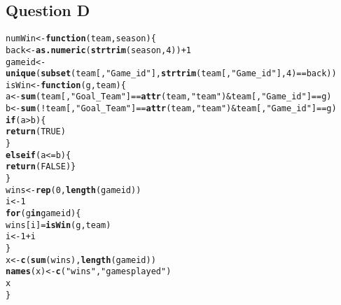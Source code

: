 \documentclass[12pt,letterpaper]{article}\usepackage[]{graphicx}\usepackage[]{color}
\makeatletter
\newcommand{\hlnum}[1]{\textcolor[rgb]{0.686,0.059,0.569}{#1}}%
\newcommand{\hlstr}[1]{\textcolor[rgb]{0.192,0.494,0.8}{#1}}%
\newcommand{\hlopt}[1]{\textcolor[rgb]{0,0,0}{#1}}%
\newcommand{\hlstd}[1]{\textcolor[rgb]{0.345,0.345,0.345}{#1}}%
\newcommand{\hlkwa}[1]{\textcolor[rgb]{0.161,0.373,0.58}{\textbf{#1}}}%
\newcommand{\hlkwb}[1]{\textcolor[rgb]{0.69,0.353,0.396}{#1}}%
\newcommand{\hlkwc}[1]{\textcolor[rgb]{0.333,0.667,0.333}{#1}}%
\newcommand{\hlkwd}[1]{\textcolor[rgb]{0.737,0.353,0.396}{\textbf{#1}}}%
\newenvironment{kframe}{%
 \def\at@end@of@kframe{}%
 \ifinner\ifhmode%
  \def\at@end@of@kframe{\end{minipage}}%
  \begin{minipage}{\columnwidth}%
 \fi\fi%
 \def\FrameCommand##1{\hskip\@totalleftmargin \hskip-\fboxsep
 \colorbox{shadecolor}{##1}\hskip-\fboxsep
     \hskip-\linewidth \hskip-\@totalleftmargin \hskip\columnwidth}%
 \MakeFramed {\advance\hsize-\width
   \@totalleftmargin\z@ \linewidth\hsize
   \@setminipage}}%
 {\par\unskip\endMakeFramed%
 \at@end@of@kframe}
\newenvironment{knitrout}{}{} %
\makeatother
\begin{document}
\newpage
\subsection{Question D}
\begin{knitrout}
\color{fgcolor}\begin{kframe}
\begin{alltt}
\hlstd{numWin} \hlkwb{<-} \hlkwa{function}\hlstd{(}\hlkwc{team}\hlstd{,} \hlkwc{season}\hlstd{)\{}
  \hlstd{back} \hlkwb{<-} \hlkwd{as.numeric}\hlstd{(}\hlkwd{strtrim}\hlstd{(season,}\hlnum{4}\hlstd{))}\hlopt{+}\hlnum{1}
  \hlstd{gameid} \hlkwb{<-} \hlkwd{unique}\hlstd{(}\hlkwd{subset}\hlstd{(team[,}\hlstr{"Game_id"}\hlstd{],} \hlkwd{strtrim}\hlstd{(team[,}\hlstr{"Game_id"}\hlstd{],}\hlnum{4}\hlstd{)}\hlopt{==}\hlstd{back))}
  \hlstd{isWin} \hlkwb{<-} \hlkwa{function}\hlstd{(}\hlkwc{g}\hlstd{,} \hlkwc{team}\hlstd{)\{}
    \hlstd{a} \hlkwb{<-} \hlkwd{sum}\hlstd{(team[,} \hlstr{"Goal_Team"}\hlstd{]}\hlopt{==}\hlkwd{attr}\hlstd{(team,}\hlstr{"team"}\hlstd{)}\hlopt{&}\hlstd{team[,}\hlstr{"Game_id"}\hlstd{]}\hlopt{==}\hlstd{g)}
    \hlstd{b} \hlkwb{<-} \hlkwd{sum}\hlstd{(}\hlopt{!}\hlstd{team[,}\hlstr{"Goal_Team"}\hlstd{]}\hlopt{==}\hlkwd{attr}\hlstd{(team,}\hlstr{"team"}\hlstd{)}\hlopt{&}\hlstd{team[,}\hlstr{"Game_id"}\hlstd{]}\hlopt{==}\hlstd{g)}
    \hlkwa{if} \hlstd{(a}\hlopt{>}\hlstd{b)\{}
      \hlkwd{return}\hlstd{(}\hlnum{TRUE}\hlstd{)}
    \hlstd{\}}
    \hlkwa{else if} \hlstd{(a}\hlopt{<=}\hlstd{b)\{}
      \hlkwd{return}\hlstd{(}\hlnum{FALSE}\hlstd{)\}}
  \hlstd{\}}
  \hlstd{wins} \hlkwb{<-} \hlkwd{rep}\hlstd{(}\hlnum{0}\hlstd{,}\hlkwd{length}\hlstd{(gameid))}
  \hlstd{i} \hlkwb{<-} \hlnum{1}
  \hlkwa{for} \hlstd{(g} \hlkwa{in} \hlstd{gameid) \{}
    \hlstd{wins[i]}\hlkwb{=}\hlkwd{isWin}\hlstd{(g,team)}
    \hlstd{i} \hlkwb{<-} \hlnum{1}\hlopt{+}\hlstd{i}
  \hlstd{\}}
  \hlstd{x} \hlkwb{<-} \hlkwd{c}\hlstd{(}\hlkwd{sum}\hlstd{(wins),} \hlkwd{length}\hlstd{(gameid))}
  \hlkwd{names}\hlstd{(x)} \hlkwb{<-} \hlkwd{c}\hlstd{(}\hlstr{"wins"}\hlstd{,} \hlstr{"gamesplayed"}\hlstd{)}
  \hlstd{x}
\hlstd{\}}
\end{alltt}
\end{kframe}
\end{knitrout}

\newpage
\end{document}
